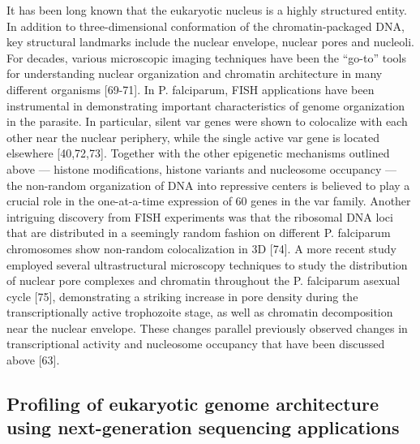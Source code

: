 It has been long known that the eukaryotic nucleus is a highly structured
entity. In addition to three-dimensional conformation of the
chromatin-packaged DNA, key structural landmarks include the nuclear envelope,
nuclear pores and nucleoli. For decades, various microscopic imaging
techniques have been the “go-to” tools for understanding nuclear organization
and chromatin architecture in many different organisms [69-71]. In P.
falciparum, FISH applications have been instrumental in demonstrating
important characteristics of genome organization in the parasite. In
particular, silent var genes were shown to colocalize with each other near the
nuclear periphery, while the single active var gene is located elsewhere
[40,72,73]. Together with the other epigenetic mechanisms outlined above —
histone modifications, histone variants and nucleosome occupancy — the
non-random organization of DNA into repressive centers is believed to play a
crucial role in the one-at-a-time expression of 60 genes in the var family.
Another intriguing discovery from FISH experiments was that the ribosomal DNA
loci that are distributed in a seemingly random fashion on different P.
falciparum chromosomes show non-random colocalization in 3D [74]. A more
recent study employed several ultrastructural microscopy techniques to study
the distribution of nuclear pore complexes and chromatin throughout the P.
falciparum asexual cycle [75], demonstrating a striking increase in pore
density during the transcriptionally active trophozoite stage, as well as
chromatin decomposition near the nuclear envelope. These changes parallel
previously observed changes in transcriptional activity and nucleosome
occupancy that have been discussed above [63].

\subsection{Profiling of eukaryotic genome architecture using next-generation
sequencing applications}

